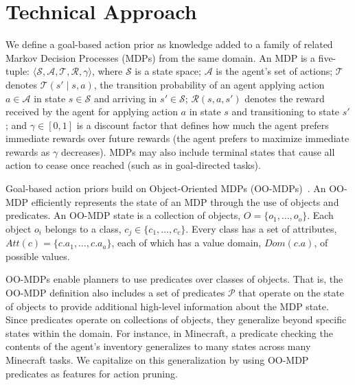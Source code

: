 \documentclass[letterpaper]{article}
\begin{document}
\section{Technical Approach}
\label{sec:Technical Approach}

We define a goal-based action prior as knowledge added to a family of related
Markov Decision Processes (MDPs) from the same domain.  An MDP is a
five-tuple: $\langle \mathcal{S}, \mathcal{A}, \mathcal{T},
\mathcal{R}, \gamma \rangle$, where $\mathcal{S}$ is a state space;
$\mathcal{A}$ is the agent's set of actions; $\mathcal{T}$ denotes
$\mathcal{T}(s' \mid s,a)$, the transition probability of an agent
applying action $a \in \mathcal{A}$ in state $s \in \mathcal{S}$ and
arriving in $s' \in \mathcal{S}$; $\mathcal{R}(s,a,s')$ denotes the
reward received by the agent for applying action $a$ in state $s$ and
transitioning to state $s'$; and $\gamma \in [0, 1]$ is a discount
  factor that defines how much the agent prefers immediate rewards
  over future rewards (the agent prefers to maximize immediate rewards
  as $\gamma$ decreases). MDPs may also include terminal states
  that cause all action to cease once reached (such as in goal-directed
  tasks).

Goal-based action priors build on Object-Oriented MDPs
(OO-MDPs)~\citep{diuk08}.  An OO-MDP efficiently represents the state
of an MDP through the use of objects and predicates.  An OO-MDP state
is a collection of objects, $O = \{o_1, \ldots, o_o \}$.  Each object
$o_i$ belongs to a class, $c_j \in \{c_1, \ldots, c_c\}$. Every class
has a set of attributes, $Att(c) = \{c.a_1, \ldots, c.a_a \}$, each of
which has a value domain, $Dom(c.a)$, of possible values. 

OO-MDPs enable
planners to use predicates over classes of objects. That is, the
OO-MDP definition also includes a set of predicates $\mathcal{P}$ that
operate on the state of objects to provide additional high-level
information about the MDP state. %
Since predicates operate on collections of objects, they generalize beyond
specific states within the domain.  For instance, in Minecraft,
a predicate checking the contents of the agent's inventory generalizes
to many states across many Minecraft tasks. We capitalize on this generalization
by using OO-MDP predicates as features for action
pruning.  
\end{document}
